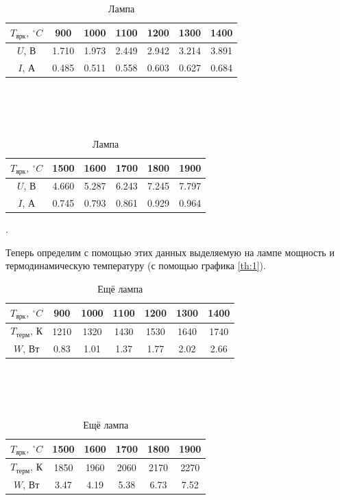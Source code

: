 \documentclass[a4paper, 12pt]{article}
\newcounter{Points}
\newcommand{\point}{\arabic{Points}. \addtocounter{Points}{1}}
\begin{document}
\begin{table}[!h]
    \centering
    \begin{tabular}{|c|c|c|c|c|c|c|}
        \hline
        $T_{ярк}, ~^\circ C$ & 900 & 1000 & 1100 & 1200 & 1300 & 1400 \\ \hline
        $U$, В & 1.710 & 1.973 & 2.449 & 2.942 & 3.214 & 3.891 \\ \hline
        $I$, А & 0.485 & 0.511 & 0.558 & 0.603 & 0.627 & 0.684 \\ \hline
    \end{tabular}
    \\~\\~
    \begin{tabular}{|c|c|c|c|c|c|}
        \hline
        $T_{ярк}, ~^\circ C$ & 1500 & 1600 & 1700 & 1800 & 1900 \\ \hline
        $U$, В & 4.660 & 5.287 & 6.243 & 7.245 & 7.797 \\ \hline
        $I$, А & 0.745 & 0.793 & 0.861 & 0.929 & 0.964 \\ \hline
    \end{tabular}
    \caption {Лампа}
    \label{tab:3}
\end{table}

\point Теперь определим с помощью этих данных выделяемую на лампе мощность и термодинамическую температуру (с помощью графика \ref{th:1}).

\begin{table}[!h]
    \centering
    \begin{tabular}{|c|c|c|c|c|c|c|}
        \hline
        $T_{ярк}, ~^\circ C$ &  900 & 1000 & 1100 & 1200 & 1300 & 1400 \\ \hline
        $T_{терм}$, К        & 1210 & 1320 & 1430 & 1530 & 1640 & 1740 \\ \hline
        $W$, Вт              & 0.83 & 1.01 & 1.37 & 1.77 & 2.02 & 2.66 \\ \hline
    \end{tabular}
    \\~\\~
    \begin{tabular}{|c|c|c|c|c|c|}
        \hline
        $T_{ярк}, ~^\circ C$  & 1500 & 1600 & 1700 & 1800 & 1900 \\ \hline
        $T_{терм}$, К         & 1850 & 1960 & 2060 & 2170 & 2270 \\ \hline
        $W$, Вт               & 3.47 & 4.19 & 5.38 & 6.73 & 7.52 \\ \hline
    \end{tabular}
    \caption {Ещё лампа}
    \label{tab:4}
\end{table}
\end{document}

